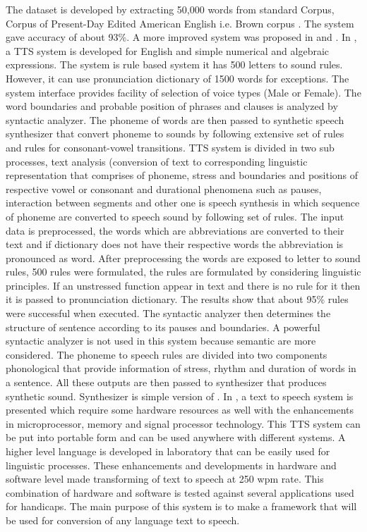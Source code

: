 The dataset is developed by extracting
50,000 words from standard Corpus, Corpus of Present-Day Edited American English i.e. Brown
corpus \cite{ku1967computational}. The system gave accuracy of about 93\%. A more
improved system was proposed in \cite{carlson1982multi} and \cite{klatt1982klattalk}. 
In \cite{klatt1982klattalk}, a TTS system is developed for English and simple numerical and algebraic expressions. 
The system is rule based system it has 500 letters to sound rules. However, it can use pronunciation dictionary of 1500 words for exceptions. 
The system interface provides facility of selection of voice types (Male or Female). The word boundaries and probable
position of phrases and clauses is analyzed by syntactic analyzer. The phoneme of words are then passed to synthetic speech
synthesizer that convert phoneme to sounds by following extensive set of rules and rules for consonant-vowel transitions. 
TTS system is divided in two sub processes, text analysis (conversion of text to
corresponding linguistic representation that comprises of phoneme, stress and boundaries and positions of respective vowel
or consonant and durational phenomena such as pauses, interaction between segments \cite{klatt1979synthesis} and other one is
speech synthesis in which sequence of phoneme are converted to speech sound by following set of rules. The input data is
preprocessed, the words which are abbreviations are converted to their text and if dictionary does not have their respective
words the abbreviation is pronounced as word. After preprocessing the words are exposed to letter to sound rules, 500 rules
were formulated, the rules are formulated by considering linguistic principles. If an unstressed function appear in text and
there is no rule for it then it is passed to pronunciation dictionary. The results show that about 95\% rules were successful
when executed. The syntactic analyzer then determines the structure of sentence according to its pauses and boundaries. A
powerful syntactic analyzer is not used in this system because semantic are more considered. The phoneme to speech rules
are divided into two components phonological that provide information of stress, rhythm and duration of words in a sentence.
All these outputs are then passed to synthesizer that produces synthetic sound. Synthesizer is simple version of \cite{klatt1980software}.
In \cite{carlson1982multi}, a text to speech system is presented which require some hardware resources as well with the enhancements in microprocessor, 
memory and signal processor technology. This TTS system can be put into portable form and can be used anywhere with different systems. A higher level language is
developed in laboratory that can be easily used for linguistic processes. These enhancements and developments in hardware
and software level made transforming of text to speech at 250 wpm rate. This combination of hardware and software is tested
against several applications used for handicaps. The main purpose of this system is to make a framework that will
be used for conversion of any language text to speech.

